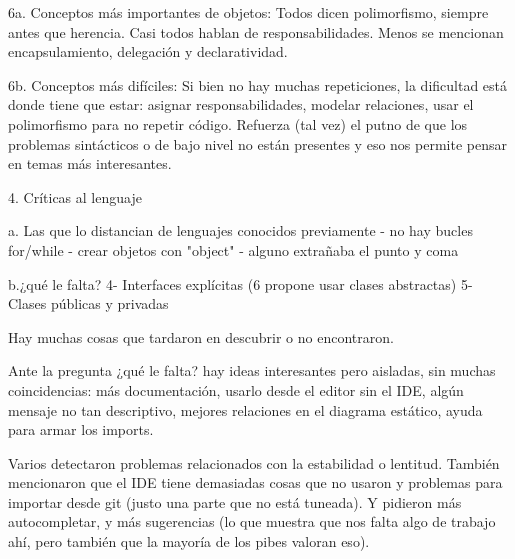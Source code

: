 6a. Conceptos más importantes de objetos: 
Todos dicen polimorfismo, siempre antes que herencia.
Casi todos hablan de responsabilidades.
Menos se mencionan encapsulamiento, delegación y declaratividad.

6b. Conceptos más difíciles:
Si bien no hay muchas repeticiones, la dificultad está donde tiene que estar: asignar responsabilidades, modelar relaciones, usar el polimorfismo para no repetir código.
Refuerza (tal vez) el putno de que los problemas sintácticos o de bajo nivel no están presentes y eso nos permite pensar en temas más interesantes.





4. Críticas al lenguaje

a. Las que lo distancian de lenguajes conocidos previamente
- no hay bucles for/while
- crear objetos con "object"
- alguno extrañaba el punto y coma

b.¿qué le falta?
  4- Interfaces explícitas (6 propone usar clases abstractas)
  5- Clases públicas y privadas

Hay muchas cosas que tardaron en descubrir o no encontraron.

Ante la pregunta ¿qué le falta? hay ideas interesantes pero aisladas, sin muchas coincidencias: más documentación, usarlo desde el editor sin el IDE, algún mensaje no tan descriptivo, mejores relaciones en el diagrama estático, ayuda para armar los imports.

Varios detectaron problemas relacionados con la estabilidad o lentitud. También mencionaron que el IDE tiene demasiadas cosas que no usaron y problemas para importar desde git (justo una parte que no está tuneada).
Y pidieron más autocompletar, y más sugerencias (lo que muestra que nos falta algo de trabajo ahí, pero también que la mayoría de los pibes valoran eso).
